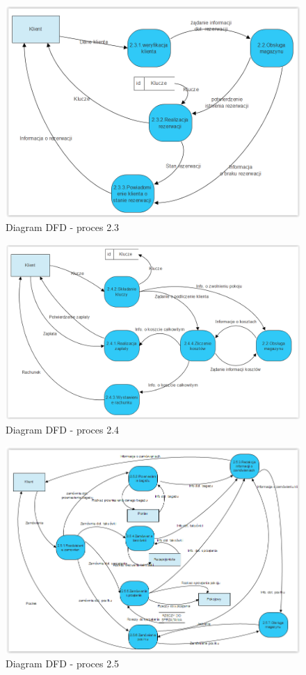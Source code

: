 \documentclass[a4paper, 11pt]{article}
\begin{document}
	\begin{figure}[H]%
			\center
			\includegraphics[scale=0.7]{Img/2-3.png}
			\caption{Diagram DFD - proces 2.3}
	\end{figure}
	\begin{figure}[H]%
			\center
			\includegraphics[scale=0.7]{Img/2-4.png}
			\caption{Diagram DFD - proces 2.4}
	\end{figure}	
	\begin{figure}[H]%
			\center
			\includegraphics[scale=0.7]{Img/2-5.png}
			\caption{Diagram DFD - proces 2.5}
	\end{figure}
\end{document}
